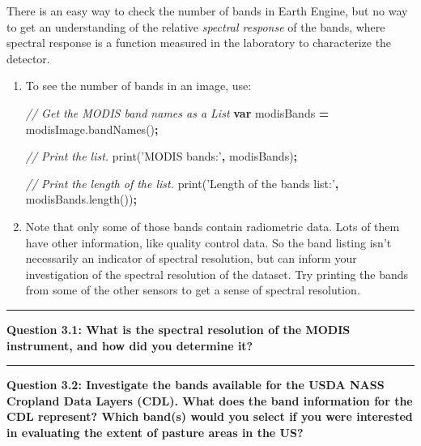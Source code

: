 \documentclass[
]{article}
\newenvironment{Shaded}{\begin{snugshade}}{\end{snugshade}}
\newcommand{\AttributeTok}[1]{\textcolor[rgb]{0.77,0.63,0.00}{#1}}
\newcommand{\CommentTok}[1]{\textcolor[rgb]{0.56,0.35,0.01}{\textit{#1}}}
\newcommand{\KeywordTok}[1]{\textcolor[rgb]{0.13,0.29,0.53}{\textbf{#1}}}
\newcommand{\NormalTok}[1]{#1}
\newcommand{\OperatorTok}[1]{\textcolor[rgb]{0.81,0.36,0.00}{\textbf{#1}}}
\newcommand{\StringTok}[1]{\textcolor[rgb]{0.31,0.60,0.02}{#1}}
\newcommand{\VariableTok}[1]{\textcolor[rgb]{0.00,0.00,0.00}{#1}}
\begin{document}
There is an easy way to check the number of bands in Earth Engine, but no way to get an understanding of the relative \emph{spectral response} of the bands, where spectral response is a function measured in the laboratory to characterize the detector.

\begin{enumerate}
\def\labelenumi{\arabic{enumi}.}
\item
  To see the number of bands in an image, use:

\begin{Shaded}
\begin{Highlighting}[]
\CommentTok{// Get the MODIS band names as a List}
\KeywordTok{var}\NormalTok{ modisBands }\OperatorTok{=} \VariableTok{modisImage}\NormalTok{.}\AttributeTok{bandNames}\NormalTok{()}\OperatorTok{;}

\CommentTok{// Print the list.}
\AttributeTok{print}\NormalTok{(}\StringTok{'MODIS bands:'}\OperatorTok{,}\NormalTok{ modisBands)}\OperatorTok{;}

\CommentTok{// Print the length of the list.}
\AttributeTok{print}\NormalTok{(}\StringTok{'Length of the bands list:'}\OperatorTok{,} \VariableTok{modisBands}\NormalTok{.}\AttributeTok{length}\NormalTok{())}\OperatorTok{;}
\end{Highlighting}
\end{Shaded}
\item
  Note that only some of those bands contain radiometric data. Lots of them have other information, like quality control data. So the band listing isn't necessarily an indicator of spectral resolution, but can inform your investigation of the spectral resolution of the dataset. Try printing the bands from some of the other sensors to get a sense of spectral resolution.
\end{enumerate}

\begin{center}\rule{0.5\linewidth}{0.5pt}\end{center}

\textbf{Question 3.1: What is the spectral resolution of the MODIS instrument, and how did you determine it?}

\begin{center}\rule{0.5\linewidth}{0.5pt}\end{center}

\textbf{Question 3.2: Investigate the bands available for the USDA NASS Cropland Data Layers (CDL). What does the band information for the CDL represent? Which band(s) would you select if you were interested in evaluating the extent of pasture areas in the US? }
\end{document}
